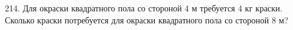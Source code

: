 214. Для окраски квадратного пола со стороной 4 м требуется 4 кг краски. Сколько краски потребуется для окраски квадратного пола со стороной 8 м?\\
